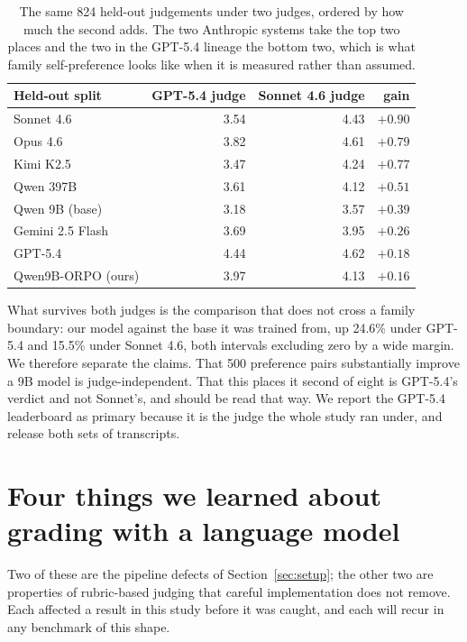 \documentclass[11pt]{article}
\begin{document}
\begin{table}[H]
\centering
\small
\begin{tabular}{lrrr}
\toprule
\textbf{Held-out split} & \textbf{GPT-5.4 judge} & \textbf{Sonnet 4.6 judge} & \textbf{gain} \\
\midrule
Sonnet 4.6 & 3.54 & 4.43 & $+0.90$ \\
Opus 4.6 & 3.82 & 4.61 & $+0.79$ \\
Kimi K2.5 & 3.47 & 4.24 & $+0.77$ \\
Qwen 397B & 3.61 & 4.12 & $+0.51$ \\
Qwen 9B (base) & 3.18 & 3.57 & $+0.39$ \\
Gemini 2.5 Flash & 3.69 & 3.95 & $+0.26$ \\
GPT-5.4 & 4.44 & 4.62 & $+0.18$ \\
Qwen9B-ORPO (ours) & 3.97 & 4.13 & $+0.16$ \\
\bottomrule
\end{tabular}
\caption{The same 824 held-out judgements under two judges, ordered by how much
the second adds. The two Anthropic systems take the top two places and the two in
the GPT-5.4 lineage the bottom two, which is what family self-preference looks
like when it is measured rather than assumed.}
\label{tab:crossjudge}
\end{table}

What survives both judges is the comparison that does not cross a family
boundary: our model against the base it was trained from, up 24.6\% under GPT-5.4
and 15.5\% under Sonnet 4.6, both intervals excluding zero by a wide margin. We
therefore separate the claims. That 500 preference pairs substantially improve a
9B model is judge-independent. That this places it second of eight is GPT-5.4's
verdict and not Sonnet's, and should be read that way. We report the GPT-5.4
leaderboard as primary because it is the judge the whole study ran under, and
release both sets of transcripts.


\section{Four things we learned about grading with a language model}
\label{sec:judgelessons}


Two of these are the pipeline defects of Section~\ref{sec:setup}; the other two
are properties of rubric-based judging that careful implementation does not
remove. Each affected a result in this study before it was caught, and each will
recur in any benchmark of this shape.
\end{document}
